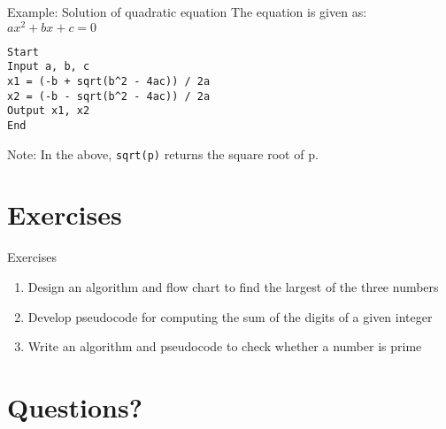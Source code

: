 \documentclass[12pt, aspectratio=169]{beamer}
\begin{document}
    \begin{frame}[fragile]{Example: Solution of quadratic equation}
        The equation is given as: $ax^2 + bx + c = 0$
        \begin{verbatim}
Start
Input a, b, c
x1 = (-b + sqrt(b^2 - 4ac)) / 2a
x2 = (-b - sqrt(b^2 - 4ac)) / 2a
Output x1, x2
End
        \end{verbatim}

        Note: In the above, \verb|sqrt(p)| returns the square root of p.
    \end{frame}


    \section{Exercises}

    \begin{frame}{Exercises}
    \begin{enumerate}
        \item Design an algorithm and flow chart to find the largest of the three numbers
        \item Develop pseudocode for computing the sum of the digits of a given integer
        \item Write an algorithm and pseudocode to check whether a number is prime
    \end{enumerate}
    \end{frame}

    \section*{Questions?}
\end{document}
